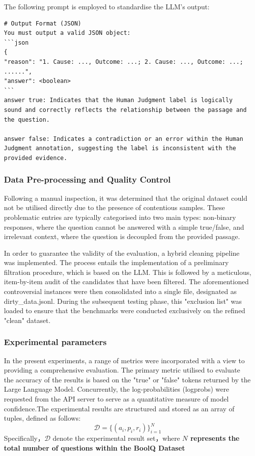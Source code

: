 The following prompt is employed to standardise the LLM's output:
\begin{verbatim}
# Output Format (JSON)
You must output a valid JSON object:
```json
{
"reason": "1. Cause: ..., Outcome: ...; 2. Cause: ..., Outcome: ...; ......",
"answer": <boolean>
```
answer true: Indicates that the Human Judgment label is logically sound and correctly reflects the relationship between the passage and the question.

answer false: Indicates a contradiction or an error within the Human Judgment annotation, suggesting the label is inconsistent with the provided evidence.
\end{verbatim}

\subsubsection{Data Pre-processing and Quality Control}

Following a manual inspection, it was determined that the original dataset could not be utilised directly due to the presence of contentious samples. These problematic entries are typically categorised into two main types: non-binary responses, where the question cannot be answered with a simple true/false, and irrelevant context, where the question is decoupled from the provided passage.

In order to guarantee the validity of the evaluation, a hybrid cleaning pipeline was implemented. The process entails the implementation of a preliminary filtration procedure, which is based on the LLM. This is followed by a meticulous, item-by-item audit of the candidates that have been filtered. The aforementioned controversial instances were then consolidated into a single file, designated as dirty\_data.jsonl. During the subsequent testing phase, this "exclusion list" was loaded to ensure that the benchmarks were conducted exclusively on the refined "clean" dataset.
\begin{placeholderblock}
[这里插入争议数据集分类类别数据表]
\end{placeholderblock}

\subsubsection{Experimental parameters}

In the present experiments, a range of metrics were incorporated with a view to providing a comprehensive evaluation. The primary metric utilised to evaluate the accuracy of the results is based on the "true" or "false" tokens returned by the Large Language Model. Concurrently, the log-probabilities (logprobs) were requested from the API server to serve as a quantitative measure of model confidence.The experimental results are structured and stored as an array of tuples, defined as follows:
$$
\mathcal{D} = \{ (a_i, p_i, r_i) \}_{i=1}^N
$$
Specifically，$\mathcal{D}$ denote the experimental result set，where 
\textbf{$N$ represents the total number of questions within the BoolQ Dataset} 

